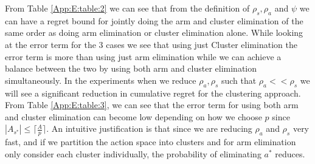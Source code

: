 \begin{remark}
\begin{table}
\begin{center}
\begin{tabular}{p{1.4cm}p{10.2cm}p{3.5cm}}
\end{tabular}
\end{center}	
\end{table}
 From Table \ref{App:E:table:2} we can see that from the definition of $\rho_{s},\rho_{a}$ and $\psi$ we can have a regret bound for jointly doing the arm and cluster elimination of the same order as doing arm elimination or cluster elimination alone. While looking at the error term for the $3$ cases we see that using just Cluster elimination  the error term is more than using just arm elimination while we can achieve a balance between the two by using both arm and cluster elimination simultaneously. In the experiments when we reduce $\rho_{a}, \rho_{s}$ such that $\rho_{a}<<\rho_{s}$ we will see a significant reduction in cumulative regret for the clustering approach. From Table \ref{App:E:table:3}, we can see that the error term for using both arm and cluster elimination can become low depending on how we choose $p$ since $|A_{s^{*}}|\leq \lceil\frac{A}{p}\rceil$. An intuitive justification is that since we are reducing $\rho_{a}$ and $\rho_{s}$ very fast, and if we partition the action space into 
clusters and for arm elimination only consider each cluster individually, the probability of eliminating $a^{*}$ reduces. 
 

\end{remark}
